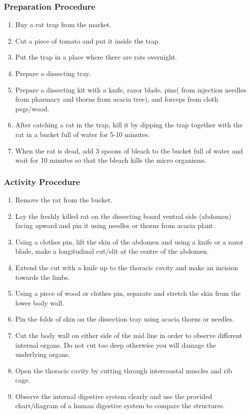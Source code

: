 \subsubsection*{Preparation Procedure}
\begin{enumerate}
\item{Buy a rat trap from the market.}
\item{Cut a piece of tomato and put it inside the trap.}
\item{Put the trap in a place where there are rats overnight.}
\item{Prepare a dissecting tray.}
\item{Prepare a dissecting kit with a knife, razor blade, pins( from injection needles from pharmacy and thorns from acacia tree), and forceps from cloth pegs/wood.}
\item{After catching a rat in the trap, kill it by dipping the trap together with the rat in a bucket full of water for 5-10 minutes.}
\item{When the rat is dead, add 3 spoons of bleach to the bucket full of water and wait for 10 minutes so that the bleach kills the micro organisms.}
\end{enumerate}

\subsubsection*{Activity Procedure}
\begin{enumerate}
\item{Remove the rat from the bucket.}
\item{Lay the freshly killed rat on the dissecting board ventral side (abdomen) facing upward and pin it using needles or thorns from acacia plant.}
\item{Using a clothes pin, lift the skin of the abdomen and using a knife or a razor blade, make a longitudinal cut/slit at the centre of the abdomen.}
\item{Extend the cut with a knife up to the thoracic cavity and make an incision towards the limbs.}
\item{Using a piece of wood or clothes pin, separate and stretch the skin from the lower body wall.}
\item{Pin the folds of skin on the dissection tray using acacia thorns or needles.}
\item{Cut the body wall on either side of the mid line in order to observe different internal organs. Do not cut too deep otherwise you will damage the underlying organs.}
\item{Open the thoracic cavity by cutting through intercoastal muscles and rib cage.}
\item{Observe the internal digestive system clearly and use the provided chart/diagram of a human digestive system to compare the structures.}
\end{enumerate}

